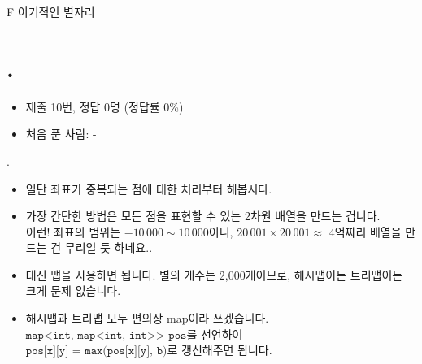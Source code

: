 
\setproblem
    {F}
    {이기적인 별자리}

\section{\pletter. \ptitle}

\begin{frame}[label=problem-F] %
    \sectiontitle{\pletter}{\ptitle}
    \begin{itemize}
        \item 제출 10번, 정답 0명 (정답률 0\%)
        \item 처음 푼 사람: -
    \end{itemize}
\end{frame}
\begin{frame}{\textbf{\pletter}. \ptitle}
    \begin{itemize}
        \item 일단 좌표가 중복되는 점에 대한 처리부터 해봅시다.
        \item 가장 간단한 방법은 모든 점을 표현할 수 있는 2차원 배열을 만드는 겁니다.\\
        이런! 좌표의 범위는 $-10\,000 \sim 10\,000$이니, $20\,001 \times 20\,001 \approx$ 4억짜리 배열을 만드는 건 무리일 듯 하네요..
        \item 대신 맵을 사용하면 됩니다.
        별의 개수는 2,000개이므로, 해시맵이든 트리맵이든 크게 문제 없습니다.
        \item 해시맵과 트리맵 모두 편의상 map이라 쓰겠습니다.\\
        $\texttt{map<int, map<int, int>{}> pos}$를 선언하여\\
        $\texttt{pos[x][y] = max(pos[x][y], b)}$로 갱신해주면 됩니다.
    \end{itemize}
\end{frame}

